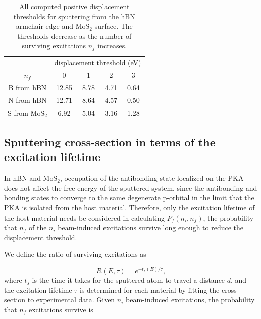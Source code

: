\documentclass{article}
\begin{document}
\begin{table}
  \centering 
  \begin{tabular}{ccccc}
    \toprule &
    \multicolumn{4}{c}{displacement threshold (eV)} \\
    \cmidrule{2-5}
    $n_f$ &0 &1 &2 &3 \\
    \midrule
    B from hBN     &12.85 &8.78 &4.71 &0.64 \\  %
    N from hBN     &12.71 &8.64 &4.57 &0.50 \\  %
    S from MoS$_2$ &6.92  &5.04 &3.16 &1.28 \\  %
    \bottomrule
  \end{tabular}
  \caption{
    All computed positive displacement thresholds for sputtering from the hBN
    armchair edge and MoS$_2$ surface.
    The thresholds decrease as the number of surviving excitations $n_f$
    increases.
  } 
\label{tab:Ed}
\end{table}

\subsection{Sputtering cross-section in terms of the excitation lifetime}
\label{sec:lifetime}

In hBN and MoS$_2$, occupation of the antibonding state localized on the PKA
does not affect the free energy of the sputtered system, since the antibonding
and bonding states to converge to the same degenerate p-orbital in the limit
that the PKA is isolated from the host material.
Therefore, only the excitation lifetime of the host material needs be
considered in calculating $P_f(n_i, n_f)$, the probability that $n_f$ of the
$n_i$ beam-induced excitations survive long enough to reduce the displacement
threshold.

We define the ratio of surviving excitations as

\begin{equation}
  R(E, \tau) = e^{-t_s(E)/\tau},
  \label{eq:R}
\end{equation}
%
where $t_s$ is the time it takes for the sputtered atom to travel a distance
$d$, and the excitation lifetime $\tau$ is determined for each material by
fitting the cross-section to experimental data.
Given $n_i$ beam-induced excitations, the probability that $n_f$ excitations
survive is
\end{document}
